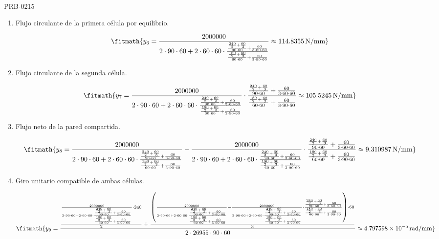 \begin{studiumworked}{PRB-0215}
\begin{enumerate}
\[\fitmath{y_{5}=\frac{\frac{\frac{240}{2}+\frac{60}{3}}{90\cdot 60}+\frac{60}{3\cdot 60\cdot 60}}{\frac{\frac{180}{2}+\frac{60}{3}}{60\cdot 60}+\frac{60}{3\cdot 90\cdot 60}}\approx 0.9189189\,}\]

\item Flujo circulante de la primera célula por equilibrio.

\[\fitmath{y_{6}=\frac{2000000}{2\cdot 90\cdot 60+2\cdot 60\cdot 60\cdot \frac{\frac{\frac{240}{2}+\frac{60}{3}}{90\cdot 60}+\frac{60}{3\cdot 60\cdot 60}}{\frac{\frac{180}{2}+\frac{60}{3}}{60\cdot 60}+\frac{60}{3\cdot 90\cdot 60}}}\approx 114.8355\,\mathrm{N/mm}}\]

\item Flujo circulante de la segunda célula.

\[\fitmath{y_{7}=\frac{2000000}{2\cdot 90\cdot 60+2\cdot 60\cdot 60\cdot \frac{\frac{\frac{240}{2}+\frac{60}{3}}{90\cdot 60}+\frac{60}{3\cdot 60\cdot 60}}{\frac{\frac{180}{2}+\frac{60}{3}}{60\cdot 60}+\frac{60}{3\cdot 90\cdot 60}}}\cdot \frac{\frac{\frac{240}{2}+\frac{60}{3}}{90\cdot 60}+\frac{60}{3\cdot 60\cdot 60}}{\frac{\frac{180}{2}+\frac{60}{3}}{60\cdot 60}+\frac{60}{3\cdot 90\cdot 60}}\approx 105.5245\,\mathrm{N/mm}}\]

\item Flujo neto de la pared compartida.

\[\fitmath{y_{8}=\frac{2000000}{2\cdot 90\cdot 60+2\cdot 60\cdot 60\cdot \frac{\frac{\frac{240}{2}+\frac{60}{3}}{90\cdot 60}+\frac{60}{3\cdot 60\cdot 60}}{\frac{\frac{180}{2}+\frac{60}{3}}{60\cdot 60}+\frac{60}{3\cdot 90\cdot 60}}}-\frac{2000000}{2\cdot 90\cdot 60+2\cdot 60\cdot 60\cdot \frac{\frac{\frac{240}{2}+\frac{60}{3}}{90\cdot 60}+\frac{60}{3\cdot 60\cdot 60}}{\frac{\frac{180}{2}+\frac{60}{3}}{60\cdot 60}+\frac{60}{3\cdot 90\cdot 60}}}\cdot \frac{\frac{\frac{240}{2}+\frac{60}{3}}{90\cdot 60}+\frac{60}{3\cdot 60\cdot 60}}{\frac{\frac{180}{2}+\frac{60}{3}}{60\cdot 60}+\frac{60}{3\cdot 90\cdot 60}}\approx 9.310987\,\mathrm{N/mm}}\]

\item Giro unitario compatible de ambas células.

\[\fitmath{y_{9}=\frac{\frac{\frac{2000000}{2\cdot 90\cdot 60+2\cdot 60\cdot 60\cdot \frac{\frac{\frac{240}{2}+\frac{60}{3}}{90\cdot 60}+\frac{60}{3\cdot 60\cdot 60}}{\frac{\frac{180}{2}+\frac{60}{3}}{60\cdot 60}+\frac{60}{3\cdot 90\cdot 60}}}\cdot 240}{2}+\frac{\left(\frac{2000000}{2\cdot 90\cdot 60+2\cdot 60\cdot 60\cdot \frac{\frac{\frac{240}{2}+\frac{60}{3}}{90\cdot 60}+\frac{60}{3\cdot 60\cdot 60}}{\frac{\frac{180}{2}+\frac{60}{3}}{60\cdot 60}+\frac{60}{3\cdot 90\cdot 60}}}-\frac{2000000}{2\cdot 90\cdot 60+2\cdot 60\cdot 60\cdot \frac{\frac{\frac{240}{2}+\frac{60}{3}}{90\cdot 60}+\frac{60}{3\cdot 60\cdot 60}}{\frac{\frac{180}{2}+\frac{60}{3}}{60\cdot 60}+\frac{60}{3\cdot 90\cdot 60}}}\cdot \frac{\frac{\frac{240}{2}+\frac{60}{3}}{90\cdot 60}+\frac{60}{3\cdot 60\cdot 60}}{\frac{\frac{180}{2}+\frac{60}{3}}{60\cdot 60}+\frac{60}{3\cdot 90\cdot 60}}\right)\cdot 60}{3}}{2\cdot 26955\cdot 90\cdot 60}\approx 4.797598\times10^{-5}\,\mathrm{rad/mm}}\]


\end{enumerate}
\end{studiumworked}
